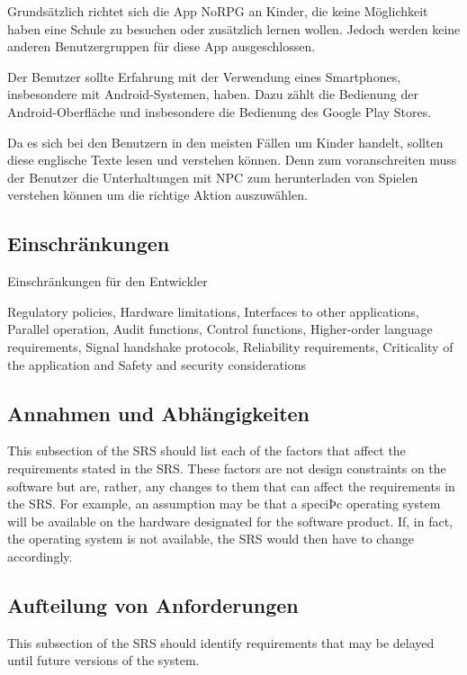 		Grundsätzlich richtet sich die App NoRPG an Kinder, die keine Möglichkeit haben eine Schule zu besuchen oder zusätzlich lernen wollen. Jedoch werden keine anderen Benutzergruppen für diese App ausgeschlossen.
		
		Der Benutzer sollte Erfahrung mit der Verwendung eines Smartphones, insbesondere mit Android-Systemen, haben. Dazu zählt die Bedienung der Android-Oberfläche und insbesondere die Bedienung des Google Play Stores.
		
		Da es sich bei den Benutzern in den meisten Fällen um Kinder handelt, sollten diese englische Texte lesen und verstehen können. Denn zum voranschreiten muss der Benutzer die Unterhaltungen mit NPC zum herunterladen von Spielen verstehen können um die richtige Aktion auszuwählen.
	
	\subsection{Einschränkungen} 
		Einschränkungen für den Entwickler
				
		Regulatory policies, Hardware limitations, Interfaces to other applications, Parallel operation, Audit functions, Control functions, Higher-order language requirements, Signal handshake protocols, Reliability requirements, Criticality of the application and Safety and security considerations
	
	\subsection{Annahmen und Abhängigkeiten}
		This subsection of the SRS should list each of the factors that affect the requirements stated in the SRS. These factors are not design constraints on the software but are, rather, any changes to them that can affect the requirements in the SRS. For example, an assumption may be that a speciÞc operating system will be available on the hardware designated for the software product. If, in fact, the operating system is not available, the SRS would then have to change accordingly.
	
	\subsection{Aufteilung von Anforderungen}
		This subsection of the SRS should identify requirements that may be delayed until future versions of the system.

